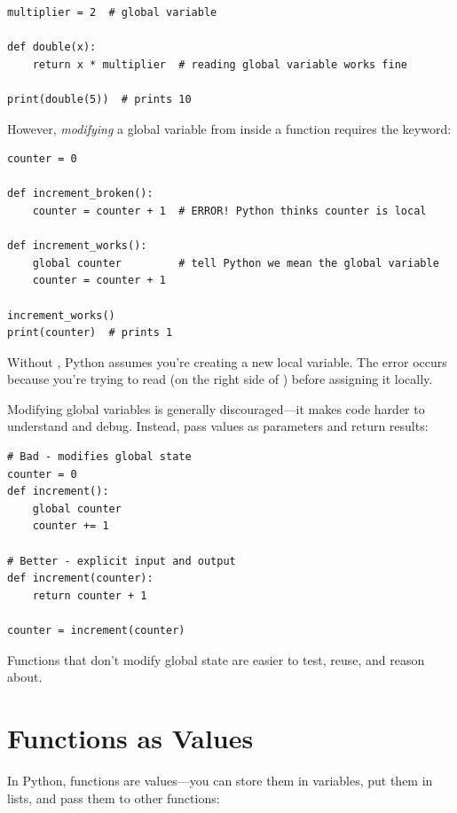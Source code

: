 \begin{lstlisting}
multiplier = 2  # global variable

def double(x):
    return x * multiplier  # reading global variable works fine

print(double(5))  # prints 10
\end{lstlisting}

However, \emph{modifying} a global variable from inside a function requires the  keyword:

\begin{lstlisting}
counter = 0

def increment_broken():
    counter = counter + 1  # ERROR! Python thinks counter is local

def increment_works():
    global counter         # tell Python we mean the global variable
    counter = counter + 1

increment_works()
print(counter)  # prints 1
\end{lstlisting}

Without , Python assumes you're creating a new local variable. The error occurs because you're trying to read  (on the right side of \py{=}) before assigning it locally.

\begin{warning}
Modifying global variables is generally discouraged---it makes code harder to understand and debug. Instead, pass values as parameters and return results:
\begin{lstlisting}
# Bad - modifies global state
counter = 0
def increment():
    global counter
    counter += 1

# Better - explicit input and output
def increment(counter):
    return counter + 1

counter = increment(counter)
\end{lstlisting}
Functions that don't modify global state are easier to test, reuse, and reason about.
\end{warning}

\section{Functions as Values}
\label{sec:functions-as-values}

In Python, functions are values---you can store them in variables, put them in lists, and pass them to other functions:

